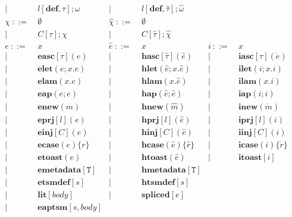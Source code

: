 \documentclass{sig-alternate}
\newcommand{\T}{\mathtt{T}}
\begin{document}
\[\begin{array}{rlrlrl}
   |~&  ~l[\mathbf{def}, \tau];\omega       &|~ & ~l[\mathbf{def}, \hat\tau];\hat\omega\\
   \chi       ~::=&~  \emptyset         &\hat\chi ~::=&~  \emptyset\\
   |~&  ~C[\tau];\chi               &|~&  ~C[\hat\tau];\hat{\chi}\\
  e       ~::=&~ x                &\hat{e}  ~::=&~  x                     & i     ~::=&~  x\\
        | ~ &~ \mathbf{easc}[\tau](e)     &       | ~ &~  \mathbf{hasc}[\hat\tau](\hat{e})    &       | ~ &~  \mathbf{iasc}[\tau](\dot{e})\\
        | ~ &~ \mathbf{elet}(e; x.e)        &       | ~ &~  \mathbf{hlet}(\hat{e}; x.\hat{e})   &       | ~ &~  \mathbf{ilet}(i;x.i)\\
        | ~ &~ \mathbf{elam}(x.e)           &       | ~ &~  \mathbf{hlam}(x.\hat{e})        &       | ~ &~  \mathbf{ilam}(x.i)\\
        | ~ &~ \mathbf{eap}(e;e)          &       | ~ &~  \mathbf{hap}(\hat{e};\hat{e})     &       | ~ &~  \mathbf{iap}(i;i)\\
        | ~ &~ \mathbf{enew}(m)           &       | ~ &~  \mathbf{hnew}(\hat{m})          &       | ~ &~  \mathbf{inew}(\dot{m})\\
        | ~ &~ \mathbf{eprj}[l](e)          &       | ~ &~  \mathbf{hprj}[l](\hat{e})       &       | ~ &~  \mathbf{iprj}[l](i)\\
        | ~ &~ \mathbf{einj}[C](e)          &       | ~ &~  \mathbf{hinj}[C](\hat{e})       &       | ~ &~  \mathbf{iinj}[C](i)\\
        | ~ &~ \mathbf{ecase}(e)\{r\}         &       | ~ &~  \mathbf{hcase}(\hat{e})\{\hat{r}\}    &       | ~ &~  \mathbf{icase}(i)\{\dot{r}\}\\
        | ~ &~ \mathbf{etoast}(e)           &       | ~ &~  \mathbf{htoast}(\hat{e})        &       | ~ &~  \mathbf{itoast}[i]\\
        | ~ &~ \mathbf{emetadata}[\T]         &       | ~ &~  \mathbf{hmetadata}[\T]\\
        | ~ &~ \mathbf{etsmdef}[s]        &       | ~ &~  \mathbf{htsmdef}[s]\\
        | ~ &~ \mathbf{lit}[body]       &       | ~ &~  \mathbf{spliced}[e]\\
        | ~ &~ \mathbf{eaptsm}[s,body]\\

\end{array}\]
\end{document}

